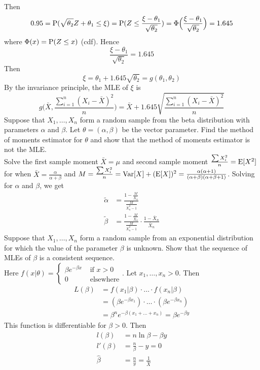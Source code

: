 \documentclass[12pt]{article}
\begin{document}
Then $$0.95 = \mathrm{P}( \sqrt{\theta_2}Z + \theta_1 \leq \xi ) = \mathrm{P}( Z \leq \frac{\xi - \theta_1}{\sqrt{\theta_2}} ) = \Phi \Big( \frac{\xi - \theta_1}{\sqrt{\theta_2}}\Big) = 1.645 $$ where $\Phi(x) = \mathrm{P}( Z \leq x )$ (cdf). Hence $$\frac{\xi - \theta_1}{\sqrt{\theta_2}} = 1.645$$ 
Then $$\xi = \theta_1 + 1.645\sqrt{\theta_2} = g(\theta_1,\theta_2)$$ 
By the invariance principle, the MLE of $\xi$ is $$g\Big( \bar{X}, \frac{\sum_{i=1}^n (X_i - \bar{X})^2}{n} \Big) = \bar{X} + 1.645\sqrt{ \frac{\sum_{i=1}^n (X_i - \bar{X})^2}{n}} $$ 
Suppose that $X_1,\dots,X_n$ form a random sample from the beta distribution with parameters $\alpha$ and $\beta$. Let $\theta = (\alpha,\beta)$ be the vector parameter. Find the method of moments estimator for $\theta$ and show that the method of moments estimator is not the MLE. \\ 
Solve the first sample moment $\bar{X} = \mu$ and second sample moment $\frac{\sum X_i^2}{n} = \mathrm{E}[ X^2 ]$ for when $\bar{X} = \frac{\alpha}{\alpha+\beta}$ and $M = \frac{\sum X_i^2}{n} = \mathrm{Var}[ X ] + (\mathrm{E}[ X ])^2 = \frac{\alpha(\alpha+1)}{(\alpha+\beta)(\alpha+\beta+1)}$. Solving for $\alpha$ and $\beta$, we get $$ \begin{aligned} 
\tilde{\alpha} &= \frac{1 - \frac{M}{\bar{X}_n}}{\frac{M}{\bar{X}_n^2 - 1}} \\ \tilde{\beta} &= \frac{1 - \frac{M}{\bar{X}_n}}{\frac{M}{\bar{X}_n^2 - 1}}\cdot \frac{1 - \bar{X}_n}{\bar{X}_n} \end{aligned} $$ 
Suppose that $X_1,\dots,X_n$ form a random sample from an exponential distribution for which the value of the parameter $\beta$ is unknown. Show that the sequence of MLEs of $\beta$ is a consistent sequence. \\
Here $f(x|\theta) = \begin{cases} \beta e^{-\beta x} &\text{ if } x > 0 \\ 0 &\text{ elsewhere} \end{cases}$. Let $x_1,\dots,x_n >0$. Then $$ \begin{aligned} 
L(\beta) &= f(x_1|\beta) \cdot \dots \cdot f(x_n|\beta) \\ &= (\beta e^{-\beta x_1})\cdot \dots\cdot (\beta e^{-\beta x_n}) \\ &= \beta^n e^{-\beta(x_1 + \dots + x_n)} = \beta e^{-\beta y} \end{aligned} $$
This function is differentiable for $\beta > 0$. Then $$ \begin{aligned} l(\beta) &= n\ln\beta - \beta y \\ l'(\beta) &= \frac{n}{\beta} - y = 0 \\ \hat{\beta} &= \frac{n}{y} = \frac{1}{\bar{X}} \end{aligned} $$ 
\end{document}
